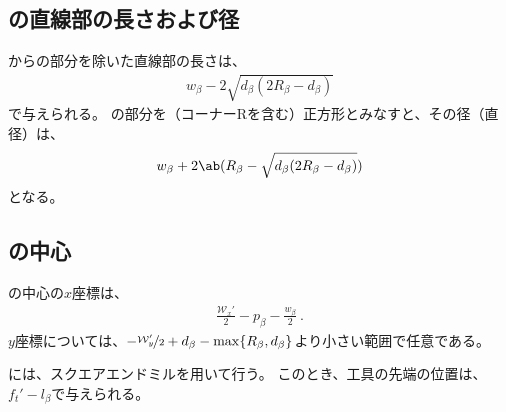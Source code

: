 \clearpage
\subsection{\EndFaceBoringWidth の直線部の長さおよび径}
\EndFaceBoringWidth から\EndFaceBoringCornerR の部分を除いた直線部の長さは、
\begin{align*}
  w_\beta-2\sqrt{d_\beta(2R_\beta-d_\beta)}
\end{align*}
で与えられる。
\EndFaceBoring の部分を（コーナーRを含む）正方形とみなすと、その径（直径）は、
\begin{align*}
  w_\beta+2\ab(R_\beta-\sqrt{d_\beta(2R_\beta-d_\beta)})
\end{align*}
となる。


\subsection{\EndFaceBoring の中心}
\EndFaceBoringWidth の中心の$x$座標は、
\begin{align*}
  \frac{\mathcal W_x'}2-p_\beta-\frac{w_\beta}2\ .
\end{align*}
$y$座標については、$-\nicefrac{\mathcal W_y'}2+d_\beta-\max\{R_\beta, d_\beta\}$より小さい範囲で任意である。



\EndFaceBoringMilling には、スクエアエンドミルを用いて行う。
このとき、工具の先端の位置は、$f_t'-l_\beta$で与えられる。
